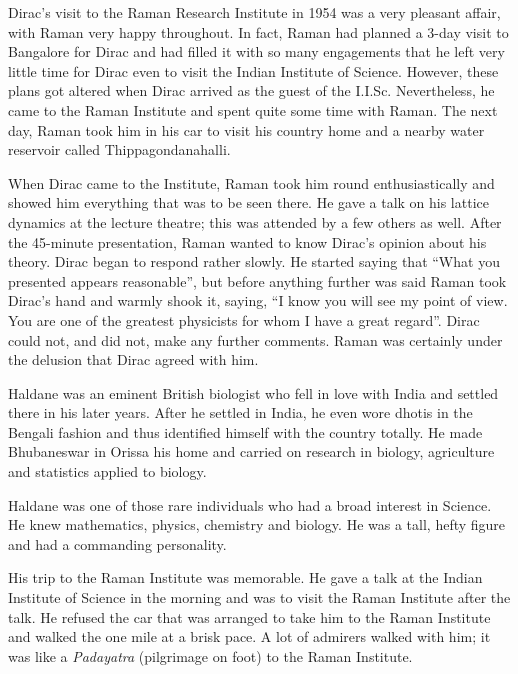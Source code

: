 \medskip
{}
\smallskip

\noindent
Dirac's visit to the Raman Research Institute in 1954 was
a very pleasant affair, with Raman very happy throughout. In
fact, Raman had planned a 3-day visit to Bangalore for Dirac
and had filled it with so many engagements that he left very little time for 
Dirac even to visit the Indian Institute of Science.
However, these plans got altered when Dirac arrived as the guest
of the I.I.Sc. Nevertheless, he came to the Raman Institute and
spent quite some time with Raman. The next day, Raman took
him in his car to visit his country home and a nearby water
reservoir called Thippagondanahalli.

When Dirac came to the Institute, Raman took him round
enthusiastically and showed him everything that was to be seen
there. He gave a talk on his lattice dynamics at the lecture theatre;
this was attended by a few others as well. After the 45-minute
presentation, Raman wanted to know Dirac's opinion about
his theory. Dirac began to respond rather slowly. He started
saying that ``What you presented appears reasonable'', but
before anything further was said Raman took Dirac's hand and
warmly shook it, saying, ``I know you will see my point of view.
You are one of the greatest physicists for whom I have a great
regard''. Dirac could not, and did not, make any further
comments. Raman was certainly under the delusion that Dirac
agreed with him.

\medskip
{}
\smallskip

\noindent
Haldane was an eminent British biologist who fell in love
with India and settled there in his later years. After he settled
in India, he even wore dhotis in the Bengali fashion and thus
identified himself with the country totally. He made Bhubanes\-war
in Orissa his home and carried on research in biology, agriculture
and statistics applied to biology.

Haldane was one of those rare individuals who had a broad
interest in Science. He knew mathematics, physics, chemistry and
biology. He was a tall, hefty figure and had a commanding
personality.

His trip to the Raman Institute was memorable. He gave
a talk at the Indian Institute of Science in the morning and
was to visit the Raman Institute after the talk. He refused the
car that was arranged to take him to the Raman Institute and
walked the one mile at a brisk pace. A lot of admirers walked
with him; it was like a {\em Padayatra} (pilgrimage on foot) to the
Raman Institute.

